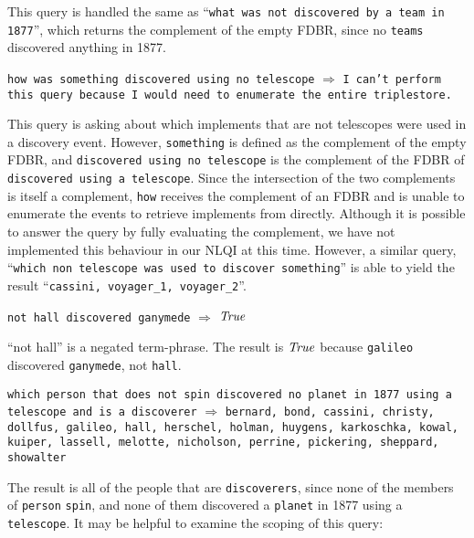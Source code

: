 \documentclass[../main.tex]{subfiles}
\begin{document}
\begin{refsection}
\examplespacing

\noindent This query is handled the same as ``\texttt{what was not discovered by a team in 1877}'', which returns the complement of the empty FDBR, since no \texttt{teams} discovered anything in 1877.

\examplespacing

\texttt{how was something discovered using no telescope} $\Rightarrow$ \texttt{I can't perform this query because I would need to enumerate the entire triplestore.}

\examplespacing

\noindent This query is asking about which implements that are not telescopes were used in a discovery event.  However, \texttt{something} is defined as the complement of the empty FDBR, and \texttt{discovered using no telescope} is the complement of the FDBR of \texttt{discovered using a telescope}.  Since the intersection of the two complements is itself a complement, \texttt{how} receives the complement of an FDBR and is unable to enumerate the events to retrieve implements from directly.  Although it is possible to answer the query by fully evaluating the complement, we have not implemented this behaviour in our NLQI at this time.  However, a similar query, ``\texttt{which non telescope was used to discover something}'' is able to yield the result ``\texttt{cassini, voyager\_1, voyager\_2}''.



\examplespacing

\texttt{not hall discovered ganymede} $\Rightarrow$ $\mathit{True}$

\examplespacing

\noindent ``not hall'' is a negated term-phrase.  The result is $\mathit{True}$ because \texttt{galileo} discovered \texttt{ganymede}, not \texttt{hall}.

\examplespacing

\texttt{which person that does not spin discovered no planet in 1877 using a telescope and is a discoverer} $\Rightarrow$ \texttt{bernard, bond, cassini, christy, dollfus, galileo, hall, herschel, holman, huygens, karkoschka, kowal, kuiper, lassell, melotte, nicholson, perrine, pickering, sheppard, showalter}

\examplespacing

\noindent The result is all of the people that are \texttt{discoverers}, since none of the members of \texttt{person} \texttt{spin}, and none of them discovered a \texttt{planet} in 1877 using a \texttt{telescope}.  It may be helpful to examine the scoping of this query:


\end{refsection}
\end{document}
